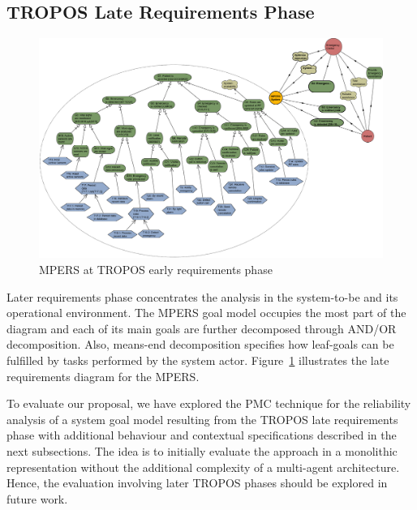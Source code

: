 
\subsection{TROPOS Late Requirements Phase}

\begin{figure}[h!]
\centering
\includegraphics[width=1\textwidth]{imgs/MPERS_LR.png}
\caption{MPERS at TROPOS early requirements phase}
\label{fig:MPERS_LR}
\end{figure}

Later requirements phase concentrates the analysis in the system-to-be and its operational environment. The MPERS goal model occupies the most part of the diagram and each of its main goals are further decomposed through AND/OR decomposition. Also, means-end decomposition specifies how leaf-goals can be fulfilled by tasks performed by the system actor. Figure~\ref{fig:MPERS_LR} illustrates the late requirements diagram for the MPERS.

To evaluate our proposal, we have explored the PMC technique for the reliability analysis of a system goal model resulting from the TROPOS late requirements phase with additional behaviour and contextual specifications described in the next subsections. The idea is to initially evaluate the approach in a monolithic representation without the additional complexity of a multi-agent architecture. Hence, the evaluation involving later TROPOS phases should be explored in future work. 


